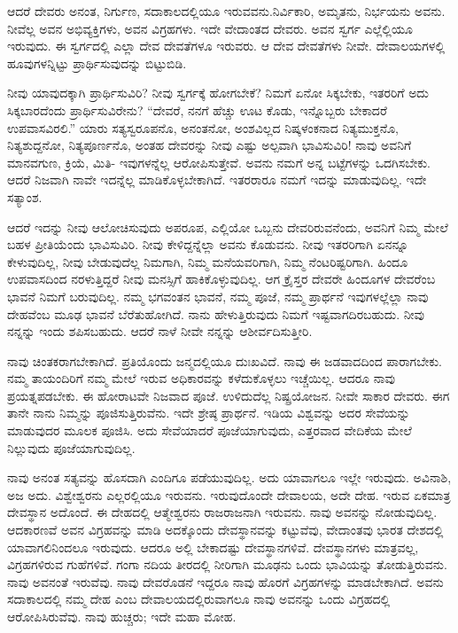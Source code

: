 ಆದರೆ ದೇವರು ಅನಂತ, ನಿರ್ಗುಣ, ಸದಾಕಾಲದಲ್ಲಿಯೂ ಇರುವವನು.\break ನಿರ್ವಿಕಾರಿ, ಅಮೃತನು, ನಿರ್ಭಯನು ಅವನು. ನೀವೆಲ್ಲ ಅವನ ಅಭಿವ್ಯಕ್ತಿಗಳು, ಅವನ ವಿಗ್ರಹಗಳು. ಇದೇ ವೇದಾಂತದ ದೇವರು. ಅವನ ಸ್ವರ್ಗ ಎಲ್ಲೆಲ್ಲಿಯೂ ಇರುವುದು. ಈ ಸ್ವರ್ಗದಲ್ಲಿ ಎಲ್ಲಾ ದೇವ ದೇವತೆಗಳೂ ಇರುವರು. ಆ ದೇವ ದೇವತೆಗಳು ನೀವೇ. ದೇವಾಲಯಗಳಲ್ಲಿ ಹೂವುಗಳನ್ನಿಟ್ಟು ಪ್ರಾರ್ಥಿಸುವುದನ್ನು ಬಿಟ್ಟುಬಿಡಿ.

ನೀವು ಯಾವುದಕ್ಕಾಗಿ ಪ್ರಾರ್ಥಿಸುವಿರಿ? ನೀವು ಸ್ವರ್ಗಕ್ಕೆ ಹೋಗಬೇಕೆ? ನಿಮಗೆ ಏನೋ ಸಿಕ್ಕಬೇಕು, ಇತರರಿಗೆ ಅದು ಸಿಕ್ಕಬಾರದೆಂದು ಪ್ರಾರ್ಥಿಸುವಿರೇನು? “ದೇವರೆ, ನನಗೆ ಹೆಚ್ಚು ಊಟ ಕೊಡು, ಇನ್ನೊಬ್ಬರು ಬೇಕಾದರೆ ಉಪವಾಸವಿರಲಿ.'' ಯಾರು ಸತ್ಯಸ್ವರೂಪನೊ, ಅನಂತನೋ, ಅಂಶವಿಲ್ಲದ ನಿಷ್ಕಳಂಕನಾದ ನಿತ್ಯಮುಕ್ತನೊ, ನಿತ್ಯಶುದ್ದನೋ, ನಿತ್ಯಪೂರ್ಣನೊ, ಅಂತಹ ದೇವರನ್ನು ನೀವು ಎಷ್ಟು ಅಲ್ಪವಾಗಿ ಭಾವಿಸುವಿರಿ! ನಾವು ಅವನಿಗೆ ಮಾನವಗುಣ, ಕ್ರಿಯೆ, ಮಿತಿ- ಇವುಗಳನ್ನೆಲ್ಲ ಆರೋಪಿಸುತ್ತೇವೆ. ಅವನು ನಮಗೆ ಅನ್ನ ಬಟ್ಟೆಗಳನ್ನು ಒದಗಿಸಬೇಕು. ಆದರೆ ನಿಜವಾಗಿ ನಾವೇ ಇದನ್ನೆಲ್ಲ ಮಾಡಿಕೊಳ್ಳಬೇಕಾಗಿದೆ. ಇತರರಾರೂ ನಮಗೆ ಇದನ್ನು ಮಾಡುವುದಿಲ್ಲ. ಇದೇ ಸತ್ಯಾಂಶ.

ಆದರೆ ಇದನ್ನು ನೀವು ಆಲೋಚಿಸುವುದು ಅಪರೂಪ, ಎಲ್ಲಿಯೋ ಒಬ್ಬನು ದೇವರಿರುವನೆಂದು, ಅವನಿಗೆ ನಿಮ್ಮ ಮೇಲೆ ಬಹಳ ಪ್ರೀತಿಯೆಂದು ಭಾವಿಸುವಿರಿ. ನೀವು ಕೇಳಿದ್ದನ್ನೆಲ್ಲಾ ಅವನು ಕೊಡುವನು. ನೀವು ಇತರರಿಗಾಗಿ ಏನನ್ನೂ ಕೇಳುವುದಿಲ್ಲ, ನೀವು ಬೇಡುವುದೆಲ್ಲ ನಿಮಗಾಗಿ, ನಿಮ್ಮ ಮನೆಯವರಿಗಾಗಿ, ನಿಮ್ಮ ನೆಂಟರಿಷ್ಟರಿಗಾಗಿ. ಹಿಂದೂ ಉಪವಾಸದಿಂದ ನರಳುತ್ತಿದ್ದರೆ ನೀವು ಮನಸ್ಸಿಗೆ ಹಾಕಿಕೊಳ್ಳುವುದಿಲ್ಲ. ಆಗ ಕ್ರೈಸ್ತರ ದೇವರೇ ಹಿಂದೂಗಳ ದೇವರೆಂಬ ಭಾವನೆ ನಿಮಗೆ ಬರುವುದಿಲ್ಲ. ನಮ್ಮ ಭಗವಂತನ ಭಾವನೆ, ನಮ್ಮ ಪೂಜೆ, ನಮ್ಮ ಪ್ರಾರ್ಥನೆ ಇವುಗಳಲ್ಲೆಲ್ಲಾ ನಾವು ದೇಹವೆಂಬ ಮೂಢ ಭಾವನೆ ಬೆರೆತುಹೋಗಿದೆ. ನಾನು ಹೇಳುತ್ತಿರುವುದು ನಿಮಗೆ ಇಷ್ಟವಾಗದಿರಬಹುದು. ನೀವು ನನ್ನನ್ನು ಇಂದು ಶಪಿಸಬಹುದು. ಆದರೆ ನಾಳೆ ನೀವೇ ನನ್ನನ್ನು ಆಶೀರ್ವದಿಸುತ್ತೀರಿ.

ನಾವು ಚಿಂತಕರಾಗಬೇಕಾಗಿದೆ. ಪ್ರತಿಯೊಂದು ಜನ್ಮದಲ್ಲಿಯೂ ದುಃಖವಿದೆ. ನಾವು ಈ ಜಡವಾದದಿಂದ ಪಾರಾಗಬೇಕು. ನಮ್ಮ ತಾಯಂದಿರಿಗೆ ನಮ್ಮ ಮೇಲೆ ಇರುವ ಅಧಿಕಾರವನ್ನು ಕಳೆದುಕೊಳ್ಳಲು ಇಚ್ಚೆಯಿಲ್ಲ. ಆದರೂ ನಾವು ಪ್ರಯತ್ನಪಡಬೇಕು. ಈ ಹೋರಾಟವೇ ನಿಜವಾದ ಪೂಜೆ. ಉಳಿದುದೆಲ್ಲ ನಿಷ್ಪ್ರಯೋಜನ. ನೀವೇ ಸಾಕಾರ ದೇವರು. ಈಗ ತಾನೇ ನಾನು ನಿಮ್ಮನ್ನು ಪೂಜಿಸುತ್ತಿರುವೆನು. ಇದೇ ಶ್ರೇಷ್ಠ ಪ್ರಾರ್ಥನೆ. ಇಡಿಯ ವಿಶ್ವವನ್ನು ಅದರ ಸೇವೆಯನ್ನು ಮಾಡುವುದರ ಮೂಲಕ ಪೂಜಿಸಿ. ಅದು ಸೇವೆಯಾದರೆ ಪೂಜೆಯಾಗುವುದು, ಎತ್ತರವಾದ ವೇದಿಕೆಯ ಮೇಲೆ ನಿಲ್ಲುವುದು ಪೂಜೆಯಾಗುವುದಿಲ್ಲ.

ನಾವು ಅನಂತ ಸತ್ಯವನ್ನು ಹೊಸದಾಗಿ ಎಂದಿಗೂ ಪಡೆಯುವುದಿಲ್ಲ. ಅದು ಯಾವಾಗಲೂ ಇಲ್ಲೇ ಇರುವುದು. ಅವಿನಾಶಿ, ಅಜ ಅದು. ವಿಶ್ವೇಶ್ವರನು ಎಲ್ಲರಲ್ಲಿಯೂ ಇರುವನು. ಇರುವುದೊಂದೇ ದೇವಾಲಯ, ಅದೇ ದೇಹ. ಇರುವ ಏಕಮಾತ್ರ ದೇವಸ್ಥಾನ ಅದೊಂದೆ. ಈ ದೇಹದಲ್ಲಿ ಆತ್ಮೇಶ್ವರನು ರಾಜರಾಜನಾಗಿ ಇರುವನು. ನಾವು ಅವನನ್ನು ನೋಡುವುದಿಲ್ಲ. ಆದಕಾರಣವೆ ಅವನ ವಿಗ್ರಹವನ್ನು ಮಾಡಿ ಅದಕ್ಕೊಂದು ದೇವಸ್ಥಾನವನ್ನು ಕಟ್ಟುವೆವು, ವೇದಾಂತವು ಭಾರತ ದೇಶದಲ್ಲಿ ಯಾವಾಗಲಿನಿಂದಲೂ ಇರುವುದು. ಆದರೂ ಅಲ್ಲಿ ಬೇಕಾದಷ್ಟು ದೇವಸ್ಥಾನಗಳಿವೆ. ದೇವಸ್ಥಾನಗಳು ಮಾತ್ರವಲ್ಲ, ವಿಗ್ರಹಗಳಿರುವ ಗುಹೆಗಳಿವೆ. ಗಂಗಾ ನದಿಯ ತೀರದಲ್ಲಿ ನೀರಿಗಾಗಿ ಮೂಢನು ಒಂದು ಭಾವಿಯನ್ನು ತೋಡುತ್ತಿರುವನು. ನಾವು ಅವನಂತೆ ಇರುವೆವು. ನಾವು ದೇವರೊಡನೆ ಇದ್ದರೂ ನಾವು ಹೊರಗೆ ವಿಗ್ರಹಗಳನ್ನು ಮಾಡಬೇಕಾಗಿದೆ. ಅವನು ಸದಾಕಾಲದಲ್ಲಿ ನಮ್ಮ ದೇಹ ಎಂಬ ದೇವಾಲಯದಲ್ಲಿರುವಾಗಲೂ ನಾವು ಅವನನ್ನು ಒಂದು ವಿಗ್ರಹದಲ್ಲಿ ಆರೋಪಿಸಿರುವೆವು. ನಾವು ಹುಚ್ಚರು; ಇದೇ ಮಹಾ ಮೋಹ.

